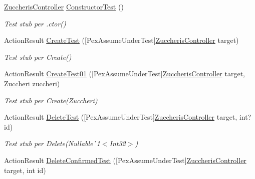 \begin{DoxyCompactItemize}
\item 
\mbox{\hyperlink{class_brew_day2_1_1_controllers_1_1_zuccheris_controller}{Zuccheris\+Controller}} \mbox{\hyperlink{class_brew_day2_1_1_controllers_1_1_tests_1_1_zuccheris_controller_test_aa8a03518069dee14e87f4f9bd4148de2}{Constructor\+Test}} ()
\begin{DoxyCompactList}\small\item\em Test stub per .ctor()\end{DoxyCompactList}\item 
Action\+Result \mbox{\hyperlink{class_brew_day2_1_1_controllers_1_1_tests_1_1_zuccheris_controller_test_a2a84ee24b2d79ac9feb42f62d3c06844}{Create\+Test}} (\mbox{[}Pex\+Assume\+Under\+Test\mbox{]}\mbox{\hyperlink{class_brew_day2_1_1_controllers_1_1_zuccheris_controller}{Zuccheris\+Controller}} target)
\begin{DoxyCompactList}\small\item\em Test stub per Create()\end{DoxyCompactList}\item 
Action\+Result \mbox{\hyperlink{class_brew_day2_1_1_controllers_1_1_tests_1_1_zuccheris_controller_test_a9f9722d1ab373649225ab01cab9fbb51}{Create\+Test01}} (\mbox{[}Pex\+Assume\+Under\+Test\mbox{]}\mbox{\hyperlink{class_brew_day2_1_1_controllers_1_1_zuccheris_controller}{Zuccheris\+Controller}} target, \mbox{\hyperlink{class_brew_day2_1_1_models_1_1_zuccheri}{Zuccheri}} zuccheri)
\begin{DoxyCompactList}\small\item\em Test stub per Create(\+Zuccheri)\end{DoxyCompactList}\item 
Action\+Result \mbox{\hyperlink{class_brew_day2_1_1_controllers_1_1_tests_1_1_zuccheris_controller_test_ade9cf5cb787f1b955e8e59166716c7b3}{Delete\+Test}} (\mbox{[}Pex\+Assume\+Under\+Test\mbox{]}\mbox{\hyperlink{class_brew_day2_1_1_controllers_1_1_zuccheris_controller}{Zuccheris\+Controller}} target, int? id)
\begin{DoxyCompactList}\small\item\em Test stub per Delete(Nullable\`{}1$<$Int32$>$)\end{DoxyCompactList}\item 
Action\+Result \mbox{\hyperlink{class_brew_day2_1_1_controllers_1_1_tests_1_1_zuccheris_controller_test_ad93ad5c717ff4815712b109e94c87133}{Delete\+Confirmed\+Test}} (\mbox{[}Pex\+Assume\+Under\+Test\mbox{]}\mbox{\hyperlink{class_brew_day2_1_1_controllers_1_1_zuccheris_controller}{Zuccheris\+Controller}} target, int id)

\end{DoxyCompactItemize}

